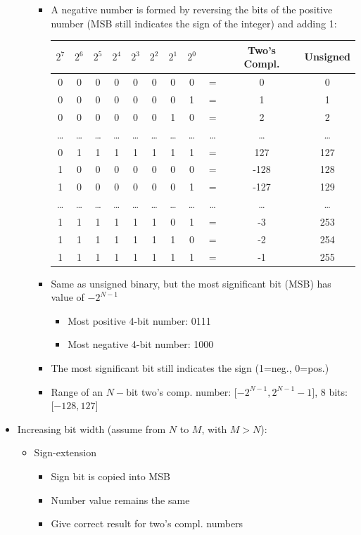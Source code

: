 \documentclass[a4paper]{article}
\begin{document}
\begin{itemize}
\begin{itemize}
\begin{itemize}
\item A negative number is formed by reversing the bits of the positive number (MSB still indicates the sign of the integer) and adding 1:\\
\begin{tabular}{|c|c|c|c|c|c|c|c|c|c|c|}
\hline
$2^7$&$2^6$&$2^5$&$2^4$&$2^3$&$2^2$&$2^1$&$2^0$&{}&Two's Compl.&Unsigned\\\hline\hline
0&0&0&0&0&0&0&0&$=$&0&0\\
0&0&0&0&0&0&0&1&$=$&1&1\\
0&0&0&0&0&0&1&0&$=$&2&2\\
\dots&\dots&\dots&\dots&\dots&\dots&\dots&\dots&\dots&\dots&\dots\\
0&1&1&1&1&1&1&1&$=$&127&127\\
1&0&0&0&0&0&0&0&$=$&-128&128\\
1&0&0&0&0&0&0&1&$=$&-127&129\\
\dots&\dots&\dots&\dots&\dots&\dots&\dots&\dots&\dots&\dots&\dots\\
1&1&1&1&1&1&0&1&$=$&-3&253\\
1&1&1&1&1&1&1&0&$=$&-2&254\\
1&1&1&1&1&1&1&1&$=$&-1&255\\\hline
\end{tabular}
\item Same as unsigned binary, but the most significant bit (MSB) has value of $-2^{N-1}$
\begin{itemize}
\item Most positive 4-bit number: 0111
\item Most negative 4-bit number: 1000
\end{itemize}
\item The most significant bit still indicates the sign (1=neg., 0=pos.)
\item Range of an $N-$bit two's comp. number: $\lbrack -2^{N-1},2^{N-1}-1\rbrack$, 8 bits:$\lbrack -128,127\rbrack$
\end{itemize}
\end{itemize}
\item Increasing bit width (assume from $N$ to $M$, with $M>N$): 
\begin{itemize}
\item Sign-extension
\begin{itemize}
\item Sign bit is copied into MSB
\item Number value remains the same
\item Give correct result for two's compl. numbers

\end{itemize}
\end{itemize}
\end{itemize}
\end{document}
